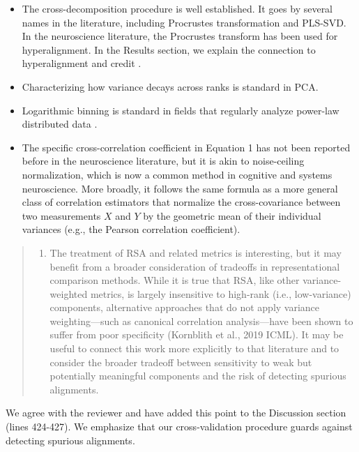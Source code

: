 \documentclass[10pt]{article}
\providecommand{\tightlist}{\setlength{\itemsep}{0pt}\setlength{\parskip}{0pt}}
\begin{document}
\begin{itemize}
\tightlist
\item
  The cross-decomposition procedure is well established. It goes by several names in the literature, including Procrustes transformation and PLS-SVD. In the neuroscience literature, the Procrustes transform has been used for hyperalignment. In the Results section, we explain the connection to hyperalignment and credit \textcite{Haxby2011}.
\item
  Characterizing how variance decays across ranks is standard in PCA.
\item
  Logarithmic binning is standard in fields that regularly analyze power-law distributed data \autocite{Milojevi2010,Lin2023}.
\item
  The specific cross-correlation coefficient in Equation 1 has not been reported before in the neuroscience literature, but it is akin to noise-ceiling normalization, which is now a common method in cognitive and systems neuroscience. More broadly, it follows the same formula as a more general class of correlation estimators that normalize the cross-covariance between two measurements \(X\) and \(Y\) by the geometric mean of their individual variances (e.g., the Pearson correlation coefficient).
\end{itemize}

\begin{quote}
\begin{enumerate}
\def\labelenumi{\arabic{enumi}.}
\setcounter{enumi}{5}
\tightlist
\item
  The treatment of RSA and related metrics is interesting, but it may benefit from a broader consideration of tradeoffs in representational comparison methods. While it is true that RSA, like other variance-weighted metrics, is largely insensitive to high-rank (i.e., low-variance) components, alternative approaches that do not apply variance weighting---such as canonical correlation analysis---have been shown to suffer from poor specificity (Kornblith et al., 2019 ICML). It may be useful to connect this work more explicitly to that literature and to consider the broader tradeoff between sensitivity to weak but potentially meaningful components and the risk of detecting spurious alignments.
\end{enumerate}
\end{quote}

We agree with the reviewer and have added this point to the Discussion section (lines 424-427). We emphasize that our cross-validation procedure guards against detecting spurious alignments.

\newpage
\printbibliography
\end{document}
